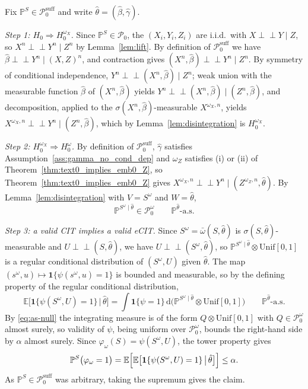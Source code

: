\documentclass[twoside,11pt]{article}
\newcommand{\indep}{\perp \!\!\! \perp}
\begin{document}
\begin{proofE}
Fix $\mathbb{P}^{S}\in\mathcal{P}_0^{\mathrm{suff}}$ and write $\hat\theta=(\hat\beta,\hat\gamma)$.

\emph{Step 1: $H_0\Rightarrow H_0^{\omega_X}$.} Since $\mathbb{P}^{S}\in\mathcal{P}_0$, the
$(X_i,Y_i,Z_i)$ are i.i.d.\ with $X\indep Y\mid Z$, so $X^n\indep Y^n\mid Z^n$ by
Lemma~\ref{lem:lift}. By definition of $\mathcal{P}_0^{\mathrm{suff}}$ we have
$\hat\beta\indep Y^n\mid (X,Z)^n$, and contraction gives $(X^n,\hat\beta)\indep Y^n\mid Z^n$.
By symmetry of conditional independence, $Y^n\indep(X^n,\hat\beta)\mid Z^n$; weak union with
the measurable function $\hat\beta$ of $(X^n,\hat\beta)$ yields
$Y^n\indep(X^n,\hat\beta)\mid(Z^n,\hat\beta)$, and decomposition, applied to the
$\sigma(X^n,\hat\beta)$-measurable $X^{\omega_X,n}$, yields
$X^{\omega_X,n}\indep Y^n\mid(Z^n,\hat\beta)$, which by Lemma~\ref{lem:disintegration} is
$H_0^{\omega_X}$.

\emph{Step 2: $H_0^{\omega_X}\Rightarrow H_0^{\omega}$.} By definition of
$\mathcal{P}_0^{\mathrm{suff}}$, $\hat\gamma$ satisfies Assumption~\ref{ass:gamma_no_cond_dep} and $\omega_Z$
satisfies (i) or (ii) of Theorem~\ref{thm:text0_implies_emb0_Z}, so Theorem~\ref{thm:text0_implies_emb0_Z} gives
$X^{\omega_X,n}\indep Y^n\mid(Z^{\omega_Z,n},\hat\theta)$. By Lemma~\ref{lem:disintegration} with
$V=S^{\omega}$ and $W=\hat\theta$,
\begin{equation}\label{eq:as-null}
\mathbb{P}^{S^{\omega}\mid\hat\theta}\in\mathcal{P}_0^{\omega}
\qquad\mathbb{P}^{\hat\theta}\text{-a.s.}
\end{equation}

\emph{Step 3: a valid CIT implies a valid eCIT.} Since $S^{\omega}=\bar\omega(S,\hat\theta)$ is
$\sigma(S,\hat\theta)$-measurable and $U\indep(S,\hat\theta)$, we have
$U\indep(S^{\omega},\hat\theta)$, so
$\mathbb{P}^{S^{\omega}\mid\hat\theta}\otimes\mathrm{Unif}[0,1]$ is a regular conditional
distribution of $(S^{\omega},U)$ given $\hat\theta$. The map
$(s^{\omega},u)\mapsto\mathbf{1}\{\psi(s^{\omega},u)=1\}$ is bounded and measurable,
so by the defining property of the regular conditional distribution,
\[
\mathbb{E}\bigl[\mathbf{1}\{\psi(S^{\omega},U)=1\}\,\big|\,\hat\theta\bigr]
=\int\mathbf{1}\{\psi=1\}\,
 \mathrm{d}\bigl(\mathbb{P}^{S^{\omega}\mid\hat\theta}\otimes\mathrm{Unif}[0,1]\bigr)
\qquad\mathbb{P}^{\hat\theta}\text{-a.s.}
\]
By \eqref{eq:as-null} the integrating measure is of the form $Q\otimes\mathrm{Unif}[0,1]$ with
$Q\in\mathcal{P}_0^{\omega}$ almost surely, so validity of $\psi$, being uniform over
$\mathcal{P}_0^{\omega}$, bounds the right-hand side by $\alpha$ almost surely. Since
$\varphi_{\omega}(S)=\psi(S^{\omega},U)$, the tower property gives
\[
\mathbb{P}^{S}\bigl(\varphi_{\omega}=1\bigr)
=\mathbb{E}\Bigl[\mathbb{E}\bigl[\mathbf{1}\{\psi(S^{\omega},U)=1\}\,\big|\,
\hat\theta\bigr]\Bigr]\le\alpha .
\]
As $\mathbb{P}^{S}\in\mathcal{P}_0^{\mathrm{suff}}$ was arbitrary, taking the supremum gives the
claim.
\end{proofE}
\end{document}
